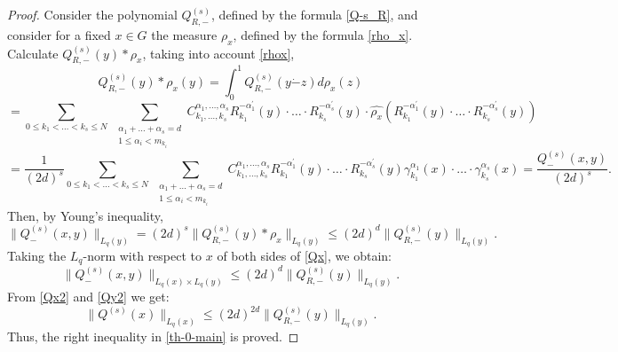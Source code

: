 \documentclass[12pt]{article}
\begin{document}
\begin{proof}
	Consider the polynomial $Q^{(s)}_{R, -}$, defined by the formula \eqref{Q-s_R}, and consider for a fixed $x\in G$ the measure $\rho_x$, defined by the formula \eqref{rho_x}. Calculate $Q^{(s)}_{R, -}(y)*\rho_x$, taking into account \eqref{rhox},
		\[
		Q^{(s)}_{R, -}(y) * \rho_x(y) = \int_0^1 Q^{(s)}_{R, -} (y\dot-z) d \rho_x(z) 
		\]
		\[
		=\sum_{0\le k_1 < \ldots < k_s \le N} \; \sum_{\substack{\alpha_1+\ldots+\alpha_s = d \\ 1 \le \alpha_i < m_{k_i}}} C_{k_1, \ldots, k_s}^{\alpha_1, \ldots, \alpha_s} R_{k_1}^{-\alpha^{\prime}_1}(y) \cdot \ldots \cdot R_{k_s}^{-\alpha^{\prime}_s}(y) \cdot \widehat{\rho_x}(R_{k_1}^{-\alpha^{\prime}_1}(y) \cdot \ldots \cdot R_{k_s}^{-\alpha^{\prime}_s}(y))
		\]
		\[
		= \frac{1}{(2d)^s} \sum_{0\le k_1 < \ldots < k_s \le N} \; \sum_{\substack{\alpha_1+\ldots+\alpha_s = d \\ 1 \le \alpha_i < m_{k_i}}} C_{k_1, \ldots, k_s}^{\alpha_1, \ldots, \alpha_s} R_{k_1}^{-\alpha^{\prime}_1}(y) \cdot \ldots \cdot R_{k_s}^{-\alpha^{\prime}_s}(y) \gamma_{k_1}^{\alpha_1}(x) \cdot \ldots \cdot \gamma_{k_s}^{\alpha_s}(x) = \frac{Q^{(s)}_{-}(x,y)}{(2d)^s}.
		\]
		Then, by Young's inequality, 
		\begin{equation} \label{Qx}
			\|Q^{(s)}_{-}(x,y)\|_{L_q(y)} = (2d)^{s}\|Q^{(s)}_{R,-}(y)* \rho_x\|_{L_q(y)} \le (2d)^{d}\|Q^{(s)}_{R,-}(y)\|_{L_q(y)}. 
		\end{equation}
		Taking the $L_q$-norm with respect to $x$ of both sides of \eqref{Qx}, we obtain:
		\begin{equation} \label{Qx2}
			\|Q^{(s)}_{-}(x,y)\|_{L_q(x)\times L_q(y)} \le (2d)^{d}\|Q^{(s)}_{R,-}(y)\|_{L_q(y)}.
		\end{equation}
		From \eqref{Qx2} and \eqref{Qy2} we get:
		\[
		\|Q^{(s)} (x)\|_{L_q(x)} \le (2d)^{2d} \|Q^{(s)}_{R,-}(y)\|_{L_q(y)}.
		\]
		Thus, the right inequality in \eqref{th-0-main} is proved.
		

\end{proof}
\end{document}
